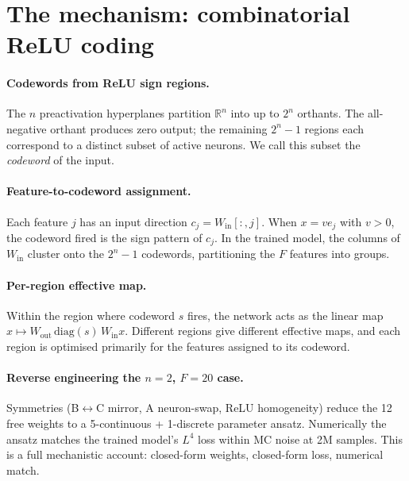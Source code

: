 \documentclass[11pt]{article}
\begin{document}
\section{The mechanism: combinatorial ReLU coding}

\paragraph{Codewords from ReLU sign regions.}
The $n$ preactivation hyperplanes partition $\mathbb{R}^n$ into up to $2^n$ orthants.
The all-negative orthant produces zero output; the remaining $2^n - 1$ regions each correspond to a distinct subset of active neurons.
We call this subset the \emph{codeword} of the input.

\paragraph{Feature-to-codeword assignment.}
Each feature $j$ has an input direction $c_j = W_{\mathrm{in}}[:,j]$.
When $x = v e_j$ with $v > 0$, the codeword fired is the sign pattern of $c_j$.
In the trained model, the columns of $W_{\mathrm{in}}$ cluster onto the $2^n - 1$ codewords, partitioning the $F$ features into groups.

\paragraph{Per-region effective map.}
Within the region where codeword $s$ fires, the network acts as the linear map $x \mapsto W_{\mathrm{out}} \, \mathrm{diag}(s) \, W_{\mathrm{in}} x$.
Different regions give different effective maps, and each region is optimised primarily for the features assigned to its codeword.

\paragraph{Reverse engineering the $n=2$, $F=20$ case.}
Symmetries (B$\leftrightarrow$C mirror, A neuron-swap, ReLU homogeneity) reduce the 12 free weights to a 5-continuous + 1-discrete parameter ansatz.
Numerically the ansatz matches the trained model's $L^4$ loss within MC noise at 2M samples.
This is a full mechanistic account: closed-form weights, closed-form loss, numerical match.
\end{document}
